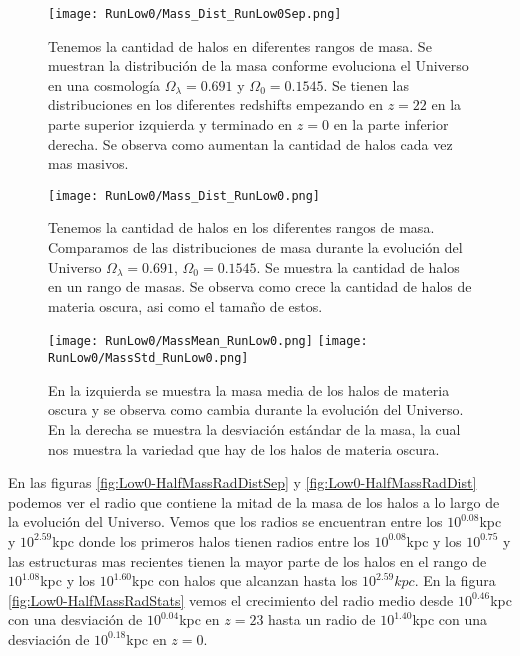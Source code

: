 \begin{figure}[H]
    \centering
    \texttt{[image: RunLow0/Mass\_Dist\_RunLow0Sep.png]}
    \caption[Distribución de masa]{\footnotesize Tenemos la cantidad de halos en diferentes rangos de masa. Se muestran la distribución de la masa conforme evoluciona el Universo en una cosmología $\Omega_\lambda = 0.691$ y $\Omega_0 = 0.1545$. Se tienen las distribuciones en los diferentes redshifts empezando en $z=22$ en la parte superior izquierda y terminado en $z=0$ en la parte inferior derecha. Se observa como aumentan la cantidad de halos cada vez mas masivos.}
    \label{fig:Low0-MassDistSep}
\end{figure}

\begin{figure}[H]
    \centering
    \texttt{[image: RunLow0/Mass\_Dist\_RunLow0.png]}
    \caption[Comparación de distribución de masa]{\footnotesize Tenemos la cantidad de halos en los diferentes rangos de masa. Comparamos de las distribuciones de masa durante la evolución del Universo $\Omega_\lambda = 0.691$, $\Omega_0 = 0.1545$. Se muestra la cantidad de halos en un rango de masas. Se observa como crece la cantidad de halos de materia oscura, asi como el tamaño de estos.}
    \label{fig:Low0-MassDist}
\end{figure}

\begin{figure}[H]
    \centering
    \texttt{[image: RunLow0/MassMean\_RunLow0.png]}
    \texttt{[image: RunLow0/MassStd\_RunLow0.png]}
    \caption[Media y desviación estándar de la distribución de masa]{\footnotesize En la izquierda se muestra la masa media de los halos de materia oscura y se observa como cambia durante la evolución del Universo. En la derecha se muestra la desviación estándar de la masa, la cual nos muestra la variedad que hay de los halos de materia oscura.}
    \label{fig:Low0-MassStats}
\end{figure}

En las figuras \ref{fig:Low0-HalfMassRadDistSep} y \ref{fig:Low0-HalfMassRadDist} podemos ver el radio que contiene la mitad de la masa de los halos a lo largo de la evolución del Universo. Vemos que los radios se encuentran entre los $10^{0.08}$kpc y $10^{2.59}$kpc donde los primeros halos tienen radios entre los $10^{0.08}$kpc y los $10^{0.75}$ y las estructuras mas recientes tienen la mayor parte de los halos en el rango de $10^{1.08}$kpc y los $10^{1.60}$kpc con halos que alcanzan hasta los $10^{2.59}kpc$. En la figura \ref{fig:Low0-HalfMassRadStats} vemos el crecimiento del radio medio desde $10^{0.46}$kpc con una desviación de $10^{0.04}$kpc en $z=23$ hasta un radio de $10^{1.40}$kpc con una desviación de $10^{0.18}$kpc en $z=0$.

